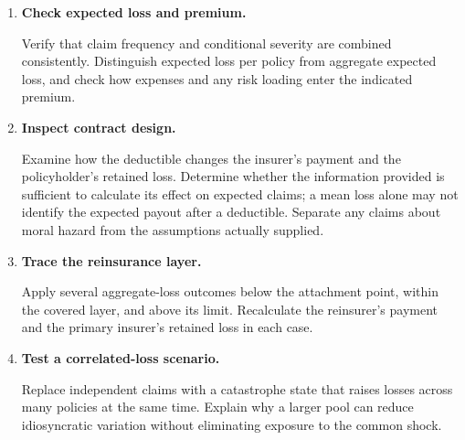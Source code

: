 \begin{enumerate}

\item \textbf{Check expected loss and premium.}

Verify that claim frequency and conditional severity are combined consistently. Distinguish expected loss per policy from aggregate expected loss, and check how expenses and any risk loading enter the indicated premium.

\item \textbf{Inspect contract design.}

Examine how the deductible changes the insurer's payment and the policyholder's retained loss. Determine whether the information provided is sufficient to calculate its effect on expected claims; a mean loss alone may not identify the expected payout after a deductible. Separate any claims about moral hazard from the assumptions actually supplied.

\item \textbf{Trace the reinsurance layer.}

Apply several aggregate-loss outcomes below the attachment point, within the covered layer, and above its limit. Recalculate the reinsurer's payment and the primary insurer's retained loss in each case.

\item \textbf{Test a correlated-loss scenario.}

Replace independent claims with a catastrophe state that raises losses across many policies at the same time. Explain why a larger pool can reduce idiosyncratic variation without eliminating exposure to the common shock.

\end{enumerate}




